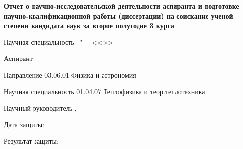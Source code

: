 \thispagestyle{empty}
\begin{center}
\thesisOrganization
\end{center}
%
\vspace{0pt plus4fill} %
\begin{center}
\textbf {\large Отчет о научно-исследовательской деятельности аспиранта и подготовке научно-квалификационной работы
(диссертации) на соискание ученой степени кандидата наук за второе полугодие 3 курса}
\end{center}
%
\begin{center}
{\large %
\thesisTitle}

\vspace{0pt plus2fill} %
\begin{minipage}[b]{0.5\linewidth}
    \begin{flushright}
        Научная специальность \thesisSpecialtyNumber\ "---
        <<\thesisSpecialtyTitle>>
    \end{flushright}
  \end{minipage}

\vspace{0pt plus2fill} %
\end{center}


Аспирант
\hfill
\thesisAuthor

Направление
\hfill
03.06.01 Физика и астрономия

Научная специальность
\hfill
01.04.07 Теплофизика и теор.теплотехника

\vskip 0.2in

Научный руководитель
\hfill
{\supervisorFioShort, \supervisorRegaliaShort}

\vskip 0.2in

Дата защиты:

\vskip 0.2in

Результат защиты:

%
\vspace{0pt plus4fill} %
{\centering\thesisCity\  \thesisYear\par}
